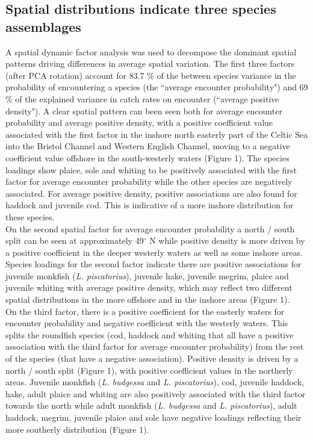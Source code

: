 \documentclass[fleqn,10pt]{wlscirep}
\begin{document}
\begin{linenumbers}
\subsection*{ Spatial distributions indicate three species assemblages
		\\} 
A spatial dynamic factor analysis was used to decompose the dominant spatial
patterns driving differences in average spatial variation. The first three
factors (after PCA rotation) account for 83.7 \% of the between species
variance in the probability of encountering a species (the ``average encounter
probability") and 69 \% of the explained variance in catch rates on encounter
(``average positive density"). A clear spatial pattern can been seen both for
average encounter probability and average positive density, with a positive
coefficient value associated with the first factor in the inshore north
easterly part of the Celtic Sea into the Bristol Channel and Western English
Channel, moving to a negative coefficient value offshore in the south-westerly
waters (Figure 1). The species loadings show plaice, sole and whiting to be
positively associated with the first factor for average encounter probability
while the other species are negatively associated. For average positive
density, positive associations are also found for haddock and juvenile cod.
This is indicative of a more inshore distribution for these species.\\ 

On the second spatial factor for average encounter probability a north / south
split can be seen at approximately 49$^{\circ}$ N while positive density is
more driven by a positive coefficient in the deeper westerly waters as well as
some inshore areas. Species loadings for the second factor indicate there are
positive associations for juvenile monkfish (\emph{L.  piscatorius}), juvenile
hake, juvenile megrim, plaice and juvenile whiting with average positive
density, which may reflect two different spatial distributions in the more
offshore and in the inshore areas (Figure 1).\\

On the third factor, there is a positive coefficient for the easterly waters
for encounter probability and negative coefficient with the westerly waters.
This splits the roundfish species (cod, haddock and whiting that all have a
positive association with the third factor for average encounter probability)
from the rest of the species (that have a negative association). Positive
density is driven by a north / south split (Figure 1), with positive
coefficient values in the northerly areas. Juvenile monkfish (\emph{L.
	budgessa} and \emph{L.  piscatorius}), cod, juvenile haddock, hake,
adult plaice and whiting are also positively associated with the third factor
towards the north while adult monkfish (\emph{L. budgessa} and \emph{L.
	piscatorius}), adult haddock, megrim, juvenile plaice and sole have
negative loadings reflecting their more southerly distribution (Figure 1).\\


\end{linenumbers}
\end{document}
